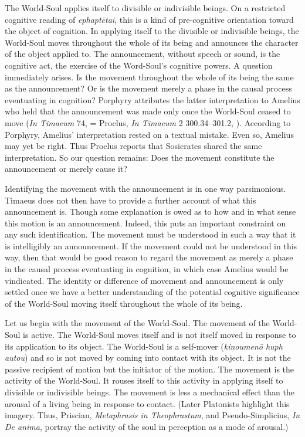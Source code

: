 The World-Soul applies itself to divisible or indivisible beings. On a restricted cognitive reading of \emph{ephaptētai}, this is a kind of pre-cognitive orientation toward the object of cognition. In applying itself to the divisible or indivisible beings, the World-Soul moves throughout the whole of its being and announces the character of the object applied to. The announcement, without speech or sound, is the cognitive act, the exercise of the Word-Soul's cognitive powers. A question immediately arises. Is the movement throughout the whole of its being the same as the announcement? Or is the movement merely a phase in the causal process eventuating in cognition? Porphyry attributes the latter interpretation to Amelius who held that the announcement was made only once the World-Soul ceased to move (\emph{In Timaeum} 74, \citealt{Sodano:1964mf} = Proclus, \emph{In Timaeum} 2 300.34--301.2, \citealt{Diehl:1903re}). According to Porphyry, Amelius' interpretation rested on a textual mistake. Even so, Amelius may yet be right. Thus Proclus reports that Sosicrates shared the same interpretation. So our question remains: Does the movement constitute the announcement or merely cause it?

Identifying the movement with the announcement is in one way parsimonious. Timaeus does not then have to provide a further account of what this announcement is. Though some explanation is owed as to how and in what sense this motion is an announcement. Indeed, this puts an important constraint on any such identification. The movement must be understood in such a way that it is intelligibly an announcement. If the movement could not be understood in this way, then that would be good reason to regard the movement as merely a phase in the causal process eventuating in cognition, in which case Amelius would be vindicated. The identity or difference of movement and announcement is only settled once we have a better understanding of the potential cognitive significance of the World-Soul moving itself throughout the whole of its being.

Let us begin with the movement of the World-Soul. The movement of the World-Soul is active. The World-Soul moves itself and is not itself moved in response to its application to its object. The World-Soul is a self-mover (\emph{kinoumenō huph autou}) and so is not moved by coming into contact with its object. It is not the passive recipient of motion but the initiator of the motion. The movement is the activity of the World-Soul. It rouses itself to this activity in applying itself to divisible or indivisible beings. The movement is less a mechanical effect than the arousal of a living being in response to contact. (Later Platonists highlight this imagery. Thus, Priscian, \emph{Metaphrasis in Theophrastum}, and Pseudo-Simplicius, \emph{In De anima}, portray the activity of the soul in perception as a mode of arousal.)

